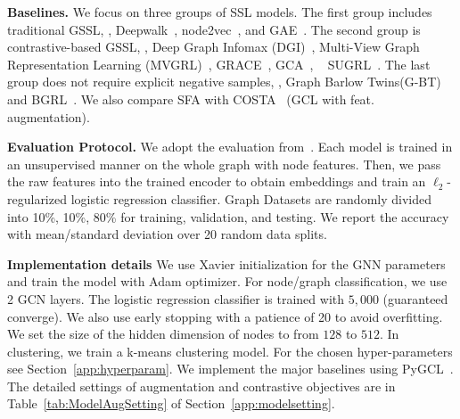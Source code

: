 \vspace{0.1cm}
\noindent\textbf{Baselines.}
We  focus on three groups of SSL models. The first group includes traditional GSSL, \ie, Deepwalk~\cite{perozzi2014deepwalk}, node2vec~\cite{grover2016node2vec}, and  GAE~\cite{kipf2016variational}. The second group is contrastive-based GSSL, \ie,  %
Deep Graph Infomax (DGI)~\cite{velickovic2019deep}, Multi-View Graph Representation Learning (MVGRL)~\cite{hassani2020contrastive}, GRACE~\cite{zhu2020deep}, GCA~\cite{zhu2021graph}, ~\cite{jin2021multi} SUGRL~\cite{mo2022simple}. The last group  %
does not require explicit negative samples, \ie, Graph Barlow Twins(G-BT)~\cite{bielak2021graph} and BGRL~\cite{thakoor2021bootstrapped}. We also compare SFA with  COSTA~\cite{zhang2022costa} (GCL with feat. augmentation).

\vspace{0.1cm}
\noindent\textbf{Evaluation Protocol.} %
We adopt the  %
evaluation from~\cite{velickovic2019deep, zhu2020deep, zhu2021graph}. Each model is trained in an unsupervised manner on the whole graph with node features. Then, we pass the raw features into the trained encoder to obtain   embeddings and train an $\ell_2$-regularized logistic regression classifier. Graph Datasets are randomly divided into 10\%, 10\%, 80\% for training, validation, and testing. We report the accuracy with mean/standard deviation over 20 random data splits.

\vspace{0.1cm}
\noindent \textbf{Implementation details} We use Xavier initialization for the GNN parameters and train the model with Adam optimizer. For node/graph classification, we use 2 GCN layers. The logistic regression classifier is trained with $5,000$ (guaranteed converge). We also use early stopping with a patience of 20 to avoid overfitting. We set the size of the hidden dimension of nodes to from ${128}$ to $512$. In clustering, we train a k-means clustering model. For the chosen hyper-parameters see Section~\ref{app:hyperparam}. We implement the major baselines using PyGCL~\cite{DBLP:journals/corr/pygcl}. The detailed settings of augmentation and contrastive objectives are in Table~\ref{tab:ModelAugSetting} of Section~\ref{app:modelsetting}. 


